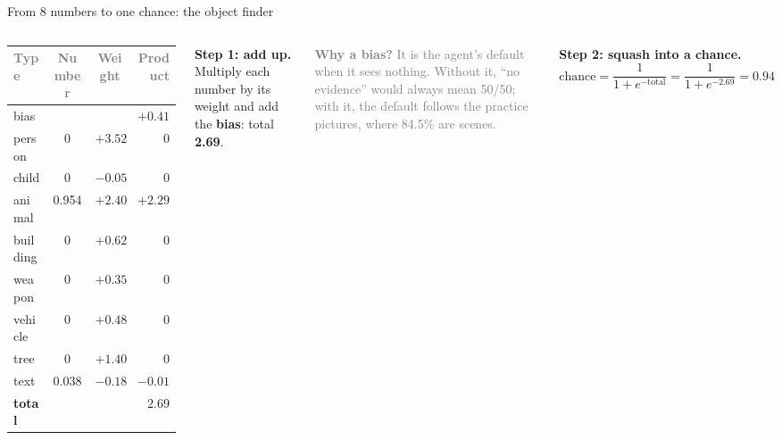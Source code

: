\documentclass[aspectratio=169,11pt]{beamer}
\renewcommand{\arraystretch}{1.3}
\newcommand{\h}[1]{\textcolor{grey}{#1}}
\begin{document}
\begin{frame}{From 8 numbers to one chance: the object finder}
\begin{columns}[T]
\footnotesize\renewcommand{\arraystretch}{1.12}
\begin{tabular}{@{}l c c r@{}}
\toprule
\h{Type} & \h{Number} & \h{Weight} & \h{Product}\\
\midrule
bias & & & $+0.41$\\
person & 0 & $+3.52$ & 0\\
child & 0 & $-0.05$ & 0\\
animal & 0.954 & $+2.40$ & $\mathbf{+2.29}$\\
building & 0 & $+0.62$ & 0\\
weapon & 0 & $+0.35$ & 0\\
vehicle & 0 & $+0.48$ & 0\\
tree & 0 & $+1.40$ & 0\\
text & 0.038 & $-0.18$ & $-0.01$\\
\midrule
\textbf{total} & & & $\mathbf{2.69}$\\
\bottomrule
\end{tabular}
\textbf{Step 1: add up.} Multiply each number by its weight and add the \textbf{bias}: total \textbf{2.69}.

\vspace{0.15cm}
{\small\textcolor{grey}{\textbf{Why a bias?} It is the agent's default when it sees nothing. Without it, ``no evidence'' would always mean 50/50; with it, the default follows the practice pictures, where 84.5\% are scenes.}}

\vspace{0.3cm}
\textbf{Step 2: squash into a chance.}
{\small
\[ \text{chance} = \frac{1}{1 + e^{-\text{total}}} = \frac{1}{1 + e^{-2.69}} = \mathbf{0.94} \]}
\end{columns}
\end{frame}
\end{document}
